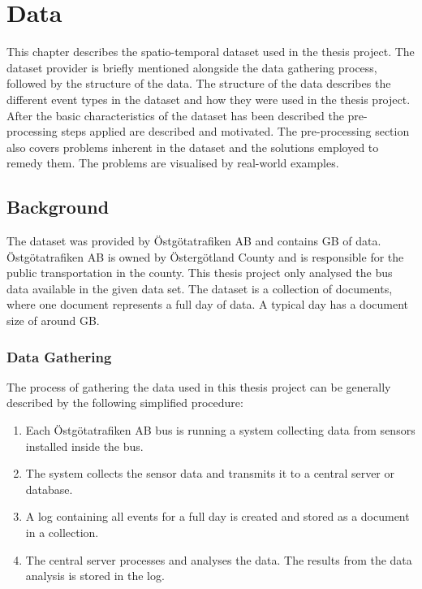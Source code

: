 \chapter{Data}
\label{cha:data}

This chapter describes the spatio-temporal dataset used in the thesis project.
The dataset provider is briefly mentioned alongside the data gathering process, followed by the structure of the data.
The structure of the data describes the different event types in the dataset and how they were used in the thesis project.
After the basic characteristics of the dataset has been described the pre-processing steps applied are described and motivated.
The pre-processing section also covers problems inherent in the dataset and the solutions employed to remedy them.
The problems are visualised by real-world examples.

\section{Background}
The dataset was provided by Östgötatrafiken AB and contains GB of data.
Östgötatrafiken AB is owned by Östergötland County and is responsible for the public transportation in the county.
This thesis project only analysed the bus data available in the given data set.
The dataset is a collection of documents, where one document represents a full day of data.
A typical day has a document size of around GB.

\subsection{Data Gathering}
The process of gathering the data used in this thesis project can be generally described by the following simplified procedure:
\begin{enumerate}
    \item Each Östgötatrafiken AB bus is running a system collecting data from sensors installed inside the bus.
    \item The system collects the sensor data and transmits it to a central server or database.
    \item A log containing all events for a full day is created and stored as a document in a collection.
    \item The central server processes and analyses the data. The results from the data analysis is stored in the log.
\end{enumerate}

